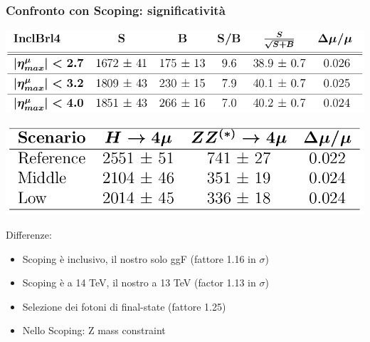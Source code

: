 \documentclass{beamer}
\begin{document}
\begin{frame}[t]
\frametitle{Confronto con Scoping: significativit\`a}

\includegraphics[width=.8\textwidth]{significanceInclBrl4}

\bigskip

\includegraphics[width=.6\textwidth]{scopingSignificance}

Differenze:\\
\begin{itemize}
\item Scoping \`e inclusivo, il nostro solo ggF (fattore 1.16 in $\sigma$)
\item Scoping \`e a 14 TeV, il nostro a 13 TeV (factor 1.13 in $\sigma$)
\item Selezione dei fotoni di final-state (fattore 1.25)
\item Nello Scoping: Z mass constraint 
\end{itemize}
\end{frame}









\end{document}
